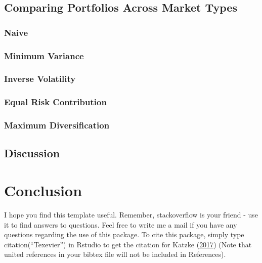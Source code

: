 \documentclass[11pt,preprint, authoryear]{elsarticle}
\numberwithin{equation}{section}
\numberwithin{figure}{section}
\numberwithin{table}{section}
\begin{document}
\hypertarget{comparing-portfolios-across-market-types}{%
\subsection{Comparing Portfolios Across Market
Types}\label{comparing-portfolios-across-market-types}}

\hypertarget{naive}{%
\subsubsection{Naive}\label{naive}}

\hypertarget{minimum-variance}{%
\subsubsection{Minimum Variance}\label{minimum-variance}}

\hypertarget{inverse-volatility}{%
\subsubsection{Inverse Volatility}\label{inverse-volatility}}

\hypertarget{equal-risk-contribution}{%
\subsubsection{Equal Risk Contribution}\label{equal-risk-contribution}}

\hypertarget{maximum-diversification}{%
\subsubsection{Maximum Diversification}\label{maximum-diversification}}

\hypertarget{discussion}{%
\subsection{Discussion}\label{discussion}}

\hypertarget{conclusion}{%
\section{\texorpdfstring{Conclusion
\label{conclusion}}{Conclusion }}\label{conclusion}}

I hope you find this template useful. Remember, stackoverflow is your
friend - use it to find answers to questions. Feel free to write me a
mail if you have any questions regarding the use of this package. To
cite this package, simply type citation(``Texevier'') in Rstudio to get
the citation for Katzke (\protect\hyperlink{ref-Texevier}{2017}) (Note
that united references in your bibtex file will not be included in
References).
\end{document}
